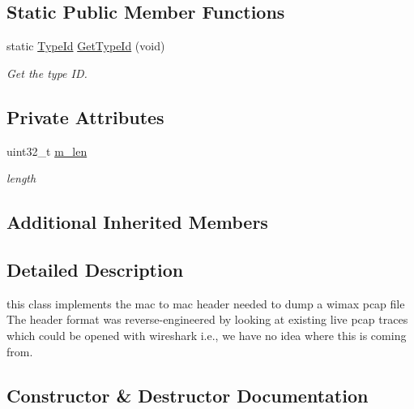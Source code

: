 \subsection*{Static Public Member Functions}
\begin{DoxyCompactItemize}
\item 
static \hyperlink{classns3_1_1TypeId}{Type\+Id} \hyperlink{classns3_1_1WimaxMacToMacHeader_ad605a91022955c77e062a52cd0509b75}{Get\+Type\+Id} (void)
\begin{DoxyCompactList}\small\item\em Get the type ID. \end{DoxyCompactList}\end{DoxyCompactItemize}
\subsection*{Private Attributes}
\begin{DoxyCompactItemize}
\item 
uint32\+\_\+t \hyperlink{classns3_1_1WimaxMacToMacHeader_ae00de1c6c413ab383c21d1386799ab1c}{m\+\_\+len}
\begin{DoxyCompactList}\small\item\em length \end{DoxyCompactList}\end{DoxyCompactItemize}
\subsection*{Additional Inherited Members}


\subsection{Detailed Description}
this class implements the mac to mac header needed to dump a wimax pcap file The header format was reverse-\/engineered by looking at existing live pcap traces which could be opened with wireshark i.\+e., we have no idea where this is coming from. 

\subsection{Constructor \& Destructor Documentation}
